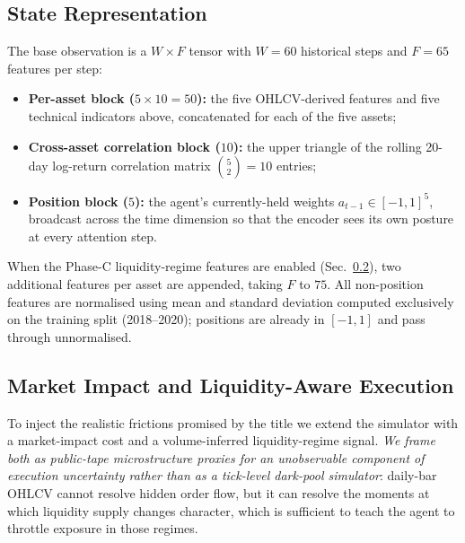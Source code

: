 \documentclass[conference]{IEEEtran}
\begin{document}
\subsection{State Representation}
\label{sec:method:state}

The base observation is a $W \times F$ tensor with $W{=}60$ historical
steps and $F{=}65$ features per step:
\begin{itemize}
  \item \textbf{Per-asset block ($5 \times 10 = 50$):} the five OHLCV-derived
        features and five technical indicators above, concatenated for
        each of the five assets;
  \item \textbf{Cross-asset correlation block ($10$):} the upper triangle
        of the rolling 20-day log-return correlation matrix
        $\binom{5}{2} = 10$ entries;
  \item \textbf{Position block ($5$):} the agent's currently-held
        weights $a_{t-1} \in [-1,1]^{5}$, broadcast across the time
        dimension so that the encoder sees its own posture at every
        attention step.
\end{itemize}
When the Phase-C liquidity-regime features are enabled
(Sec.~\ref{sec:method:impact}), two additional features per asset are
appended, taking $F$ to $75$. All non-position features are normalised
using mean and standard deviation computed exclusively on the training
split (2018--2020); positions are already in $[-1, 1]$ and pass through
unnormalised.

\subsection{Market Impact and Liquidity-Aware Execution}
\label{sec:method:impact}

To inject the realistic frictions promised by the title we extend the
simulator with a market-impact cost and a volume-inferred
liquidity-regime signal. \emph{We frame both as public-tape
microstructure proxies for an unobservable component of execution
uncertainty rather than as a tick-level dark-pool simulator}: daily-bar
OHLCV cannot resolve hidden order flow, but it can resolve the
moments at which liquidity supply changes character, which is sufficient
to teach the agent to throttle exposure in those regimes.
\end{document}
